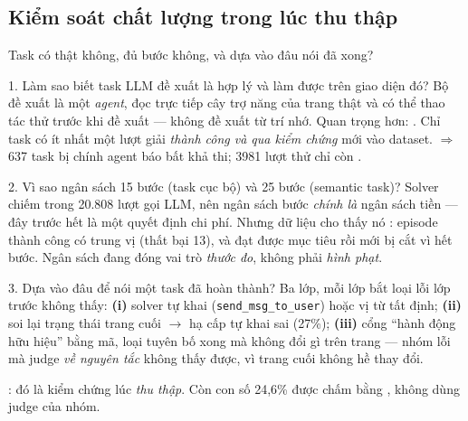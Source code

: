 \subsection{Kiểm soát chất lượng trong lúc thu thập}
\begin{frame}{Task có thật không, đủ bước không, và dựa vào đâu nói đã xong?}
  \scriptsize
  \begin{block}{1. Làm sao biết task LLM đề xuất là hợp lý và làm được trên giao diện đó?}
    Bộ đề xuất là một \emph{agent}, đọc trực tiếp cây trợ năng của trang thật và có thể
    thao tác thử trước khi đề xuất --- không đề xuất từ trí nhớ. Quan trọng hơn:
    . Chỉ task có ít nhất
    một lượt giải \emph{thành công và qua kiểm chứng} mới vào dataset.
    $\Rightarrow$ 637 task bị chính agent báo bất khả thi; 3981 lượt thử chỉ còn
    .
  \end{block}
  \vspace{-0.1cm}
  \begin{block}{2. Vì sao ngân sách 15 bước (task cục bộ) và 25 bước (semantic task)?}
    Solver chiếm  trong 20.808 lượt gọi LLM, nên ngân sách bước \emph{chính
    là} ngân sách tiền --- đây trước hết là một quyết định chi phí. Nhưng dữ liệu cho
    thấy nó : episode thành công có trung vị 
    (thất bại 13), và  đạt được mục tiêu rồi mới bị cắt vì hết
    bước. Ngân sách đang đóng vai trò \emph{thước đo}, không phải \emph{hình phạt}.
  \end{block}
  \vspace{-0.1cm}
  \begin{block}{3. Dựa vào đâu để nói một task đã hoàn thành?}
    Ba lớp, mỗi lớp bắt loại lỗi lớp trước không thấy:
    \textbf{(i)} solver tự khai (\texttt{send\_msg\_to\_user}) hoặc vị từ tất định;
    \textbf{(ii)}  soi lại trạng thái trang cuối $\rightarrow$ hạ cấp
     tự khai sai (27\%);
    \textbf{(iii)} cổng ``hành động hữu hiệu'' bằng mã, loại  tuyên
    bố xong mà không đổi gì trên trang --- nhóm lỗi mà judge \emph{về nguyên tắc} không
    thấy được, vì trang cuối không hề thay đổi.
    \vspace{0.04cm}

    : đó là kiểm chứng lúc \emph{thu thập}. Còn con số 24,6\% được chấm bằng
    , không dùng judge của nhóm.
  \end{block}
\end{frame}

